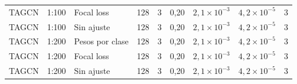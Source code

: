 \begin{longtable}{lllcccccc}
TAGCN & 1:100 & Focal loss & 128 & 3 & 0{,}20 & $2{,}1 \times 10^{-3}$ & $4{,}2 \times 10^{-5}$ & 3 \\
TAGCN & 1:100 & Sin ajuste & 128 & 3 & 0{,}20 & $2{,}1 \times 10^{-3}$ & $4{,}2 \times 10^{-5}$ & 3 \\
TAGCN & 1:200 & Pesos por clase & 128 & 3 & 0{,}20 & $2{,}1 \times 10^{-3}$ & $4{,}2 \times 10^{-5}$ & 3 \\
TAGCN & 1:200 & Focal loss & 128 & 3 & 0{,}20 & $2{,}1 \times 10^{-3}$ & $4{,}2 \times 10^{-5}$ & 3 \\
TAGCN & 1:200 & Sin ajuste & 128 & 3 & 0{,}20 & $2{,}1 \times 10^{-3}$ & $4{,}2 \times 10^{-5}$ & 3 \\
\bottomrule
\end{longtable}
